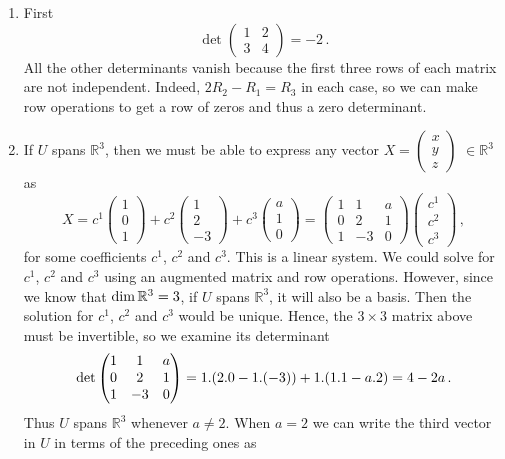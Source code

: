 \begin{enumerate}
\item First 
$$\det\begin{pmatrix}1&2\\3&4\end{pmatrix}=-2\, .$$
All the other determinants vanish because the first three rows of each matrix are not independent. 
Indeed, $2R_2-R_1=R_3$ in each case, so we can make row operations to get a row of zeros and thus a zero determinant. 

\item If $U$ spans ${\mathbb R}^3$, then we must be able to express any vector $X=\begin{pmatrix}x\\y\\z\end{pmatrix}$ $\in {\mathbb R}^3$
as
$$
X=c^1\begin{pmatrix}1\\0\\1\end{pmatrix}+c^2\begin{pmatrix}1\\2\\-3\end{pmatrix}+c^3\begin{pmatrix}a\\1\\0\end{pmatrix}
=\begin{pmatrix}1&1&a\\0&2&1\\1&-3&0\end{pmatrix}\begin{pmatrix}c^1\\c^2\\c^3\end{pmatrix}\, ,
$$
for some coefficients $c^1$, $c^2$ and $c^3$. This is a linear system. We could solve for $c^1$, $c^2$ and $c^3$ using an
augmented matrix and row operations. However, since we know that ${\rm dim}\, {\mathbb R}^3=3$, if $U$ spans ${\mathbb R}^3$,
it will also be a basis. Then the solution for  $c^1$, $c^2$ and $c^3$ would be unique. Hence, the $3\times 3$ matrix above must 
be invertible, so we examine its determinant
$$
{\rm det} \begin{pmatrix}1&1&a\\0&2&1\\1&-3&0\end{pmatrix}
=1.(2.0-1.(-3))+1.(1.1-a.2)=4-2a\, .
$$
Thus $U$ spans ${\mathbb R}^3$ whenever $a\neq 2$. When $a=2$ we can write the third vector in $U$ in terms of the preceding ones as

\end{enumerate}
